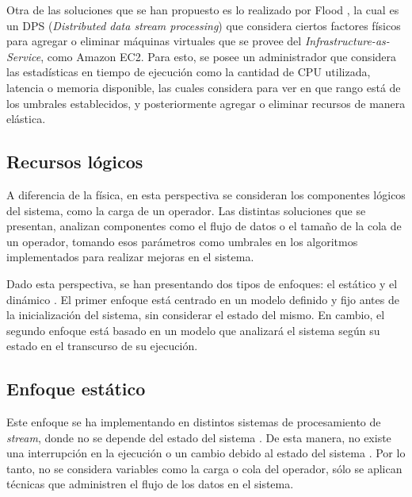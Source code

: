 Otra de las soluciones que se han propuesto es lo realizado por Flood \citep{Alves2010flood}, la cual es un DPS (\textit{Distributed data stream processing}) que considera ciertos factores físicos para agregar o eliminar máquinas virtuales que se provee del \textit{Infrastructure-as-Service}, como Amazon EC2. Para esto, se posee un administrador que considera las estadísticas en tiempo de ejecución como la cantidad de CPU utilizada, latencia o memoria disponible, las cuales considera para ver en que rango está de los umbrales establecidos, y posteriormente agregar o eliminar recursos de manera elástica.

\subsection{Recursos lógicos}
\label{subsec:recLogicosBC}

A diferencia de la física, en esta perspectiva se consideran los componentes lógicos del sistema, como la carga de un operador. Las distintas soluciones que se presentan, analizan componentes como el flujo de datos o el tamaño de la cola de un operador, tomando esos parámetros como umbrales en los algoritmos implementados para realizar mejoras en el sistema.


Dado esta perspectiva, se han presentando dos tipos de enfoques: el estático y el dinámico \citep{Gupta99loadsharing}. El primer enfoque está centrado en un modelo definido y fijo antes de la inicialización del sistema, sin considerar el estado del mismo. En cambio, el segundo enfoque está basado en un modelo que analizará el sistema según su estado en el transcurso de su ejecución.


\subsection{Enfoque estático}
\label{subsec:enfoqueEstaticoBC}
Este enfoque se ha implementando en distintos sistemas de procesamiento de \textsl{stream}, donde no se depende del estado del sistema \citep{stormtwitter, s4}. De esta manera, no existe una interrupción en la ejecución o un cambio debido al estado del sistema \citep{CasavantK88}. Por lo tanto, no se considera variables como la carga o cola del operador, sólo se aplican técnicas que administren el flujo de los datos en el sistema.

